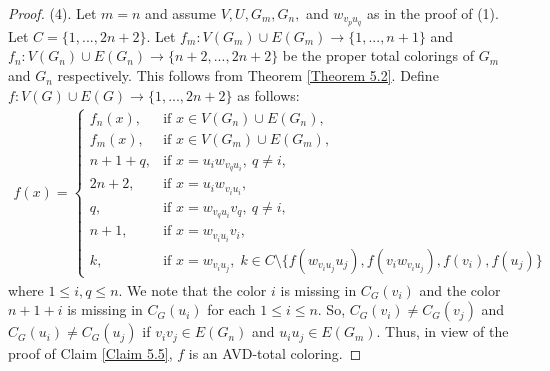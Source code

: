 \documentclass[12pt,reqno,a4paper]{amsart}
\theoremstyle{definition}
\theoremstyle{plain}
\newtheorem{question}[defn]{Question}
\begin{document}
\begin{proof}
(4). Let $m=n$ and assume $V, U, G_{m}, G_{n},$ and $w_{v_{p}u_{q}}$ as in the proof of (1). Let $C=\{1,...,2n+2\}$. Let $f_{m}: V(G_{m})\cup E(G_{m})\rightarrow \{1,...,n+1\}$ and $f_{n}: V(G_{n})\cup E(G_{n})\rightarrow \{n+2,...,2n+2\}$ be the proper total colorings of $G_{m}$ and $G_{n}$ respectively. This follows from Theorem \ref{Theorem 5.2}. Define $f: V(G)\cup E(G) \rightarrow \{1,...,2n+2\}$ as follows:
\begin{align*}
f(x)=
\begin{cases}
f_n(x), & \text{if } x\in V(G_n)\cup E(G_n),\\
f_m(x), & \text{if } x\in V(G_m)\cup E(G_m),\\
n+1+q, & \text{if } x=u_iw_{v_qu_i},\ q\neq i,\\
2n+2, & \text{if } x=u_iw_{v_iu_i},\\
q, & \text{if } x=w_{v_qu_i}v_q,\ q\neq i,\\
n+1, & \text{if } x=w_{v_iu_i}v_i,\\
k, & \text{if } x=w_{v_iu_j},\;
k\in C\setminus
\{f(w_{v_iu_j}u_j),f(v_iw_{v_iu_j}),f(v_i),f(u_j)\}
\end{cases}
\end{align*}
where $1\leq i,q\leq n$. 
We note that the color $i$ is missing in $C_{G}(v_{i})$ and the color $n+1+i$ is missing in $C_{G}(u_{i})$ for each $1\leq i\leq n$. So, $C_{G}(v_{i})\neq C_{G}(v_{j})$ and $C_{G}(u_{i})\neq C_{G}(u_{j})$ if $v_{i} v_{j}\in E(G_{n})$ and $u_{i} u_{j}\in E(G_{m})$. Thus, in view of the proof of Claim \ref{Claim 5.5}, $f$ is an AVD-total coloring.
\end{proof}


\end{document}
